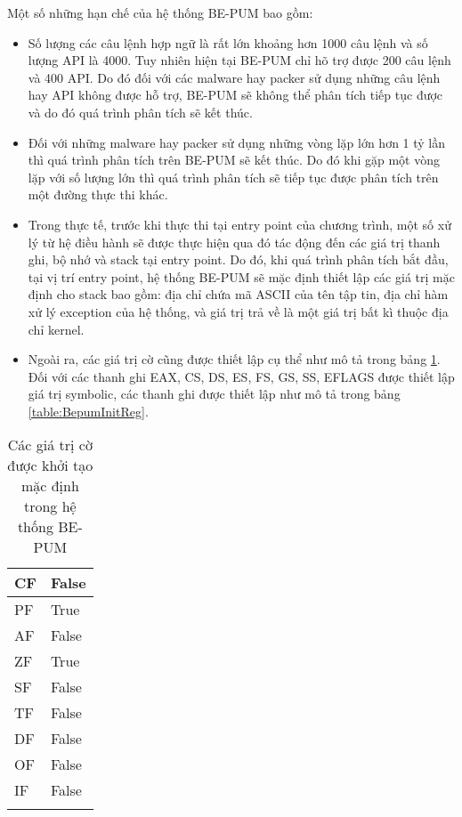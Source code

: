 \hspace{0.5cm}Một số những hạn chế của hệ thống BE-PUM bao gồm:

\begin{itemize}
\item{Số lượng các câu lệnh hợp ngữ là rất lớn khoảng hơn 1000 câu lệnh và số lượng API là 4000. Tuy nhiên hiện tại BE-PUM chỉ hõ trợ được 200 câu lệnh và 400 API. Do đó đối với các malware hay packer sử dụng những câu lệnh hay API không được hỗ trợ, BE-PUM sẽ không thể phân tích tiếp tục được và do đó quá trình phân tích sẽ kết thúc.\\}
\item{Đối với những malware hay packer sử dụng những vòng lặp lớn hơn 1 tỷ lần thì quá trình phân tích trên BE-PUM sẽ kết thúc. Do đó khi gặp một vòng lặp với số lượng lớn thì quá trình phân tích sẽ tiếp tục được phân tích trên một đường thực thi khác.\\}
\item{Trong thực tế, trước khi thực thi tại entry point của chương trình, một số xử lý từ hệ điều hành sẽ được thực hiện qua đó tác động đến các giá trị thanh ghi, bộ nhớ và stack tại entry point. Do đó, khi quá trình phân tích bắt đầu, tại vị trí entry point, hệ thống BE-PUM sẽ mặc định thiết lập các giá trị mặc định cho stack bao gồm: địa chỉ chứa mã ASCII của tên tập tin, địa chỉ hàm xử lý exception của hệ thống, và giá trị trả về là một giá trị bất kì thuộc địa chỉ kernel.\\}
\item{Ngoài ra, các giá trị cờ cũng được thiết lập cụ thể như mô tả trong bảng \ref {table:BepumInitFlag}. Đối với các thanh ghi EAX, CS, DS, ES, FS, GS, SS, EFLAGS được thiết lập giá trị symbolic, các thanh ghi được thiết lập như mô tả trong bảng \ref {table:BepumInitReg}.
}
\end{itemize}

\begin{longtable}{ | m{2cm} | m{5cm} | }
\hline 
CF & False\\
\hline 
PF & True\\
\hline 
AF & False\\
\hline 
ZF & True\\
\hline 
SF & False\\
\hline 
TF & False\\
\hline 
DF & False\\
\hline 
OF & False\\
\hline 
IF & False\\
\hline
\caption{Các giá trị cờ được khởi tạo mặc định trong hệ thống BE-PUM}
\label{table:BepumInitFlag}
\end{longtable}

